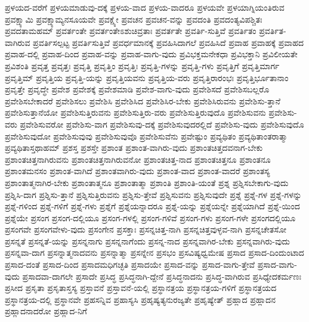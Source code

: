{ಪ್ರಳಯದ-ವರೆಗೆ
ಪ್ರಳಯಮಾಡುವು-ದಕ್ಕೆ
ಪ್ರಳಯ-ವಾದ
ಪ್ರಳಯ-ವಾದರೂ
ಪ್ರಳಯವೇ
ಪ್ರಳಯಾಗ್ನಿಯಂತಿರುವ
ಪ್ರವಕ್ಷ್ಯಾಮಿ
ಪ್ರವಕ್ಷ್ಯಾಮ್ಯನಸೂಯವೇ
ಪ್ರವಕ್ಷ್ಯೇ
ಪ್ರವಚನ
ಪ್ರವಚನ-ವನ್ನು
ಪ್ರವದಂತಿ
ಪ್ರವದಂತ್ಯವಿಪಶ್ಚಿತಃ
ಪ್ರವದತಾಮಹಮ್
ಪ್ರವರ್ತಂತೇ
ಪ್ರವರ್ತಂತೇಽಶುಚಿವ್ರತಾಃ
ಪ್ರವರ್ತತೇ
ಪ್ರವರ್ತಿ-ಸುತ್ತಿವೆ
ಪ್ರವರ್ತಿತಂ
ಪ್ರವರ್ತಿತ-ವಾಗಿರುವ
ಪ್ರವರ್ತಿಸಲ್ಪಟ್ಟ
ಪ್ರವರ್ತಿಸುತ್ತಿವೆ
ಪ್ರವರ್ಧಮಾನಕ್ಕೆ
ಪ್ರವಹಿಸಿದಾಗಲೆ
ಪ್ರವಹಿಸಿದೆ
ಪ್ರವಾಹ
ಪ್ರವಾಹಕ್ಕೆ
ಪ್ರವಾಹದ
ಪ್ರವಾಹ-ದಲ್ಲಿ
ಪ್ರವಾಹ-ದಿಂದ
ಪ್ರವಾಹ-ವನ್ನು
ಪ್ರವಾಹ-ವಾಗು-ವುದು
ಪ್ರವಿಭಕ್ತಮನೇಕಧಾ
ಪ್ರವಿಭಕ್ತಾನಿ
ಪ್ರವಿಲೀಯತೇ
ಪ್ರವಿಶಂತಿ
ಪ್ರವೃತ್ತ
ಪ್ರವೃತ್ತಃ
ಪ್ರವೃತ್ತಿ
ಪ್ರವೃತ್ತಿಂ
ಪ್ರವೃತ್ತಿಃ
ಪ್ರವೃತ್ತಿ-ಗಳನ್ನು
ಪ್ರವೃತ್ತಿ-ಗಳು
ಪ್ರವೃತ್ತಿಗೆ
ಪ್ರವೃತ್ತಿಮಾರ್ಗ
ಪ್ರವೃತ್ತಿಮ್
ಪ್ರವೃತ್ತಿಯ
ಪ್ರವೃತ್ತಿ-ಯನ್ನು
ಪ್ರವೃತ್ತಿಯವನು
ಪ್ರವೃತ್ತಿಯ-ವರು
ಪ್ರವೃತ್ತಿರಾರಂಭಃ
ಪ್ರವೃತ್ತಿರ್ಭೂತಾನಾಂ
ಪ್ರವೃತ್ತೇ
ಪ್ರವೃದ್ಧೇ
ಪ್ರವೇಶ
ಪ್ರವೇಶಕ್ಕೆ
ಪ್ರವೇಶಮಾಡಿ
ಪ್ರವೇಶ-ವಾಗು-ವುದು
ಪ್ರವೇಶಿಸದೆ
ಪ್ರವೇಶಿಸಬಲ್ಲರೊ
ಪ್ರವೇಶಿಸಬೇಕಾದರೆ
ಪ್ರವೇಶಿಸಲು
ಪ್ರವೇಶಿಸಿ
ಪ್ರವೇಶಿಸಿದ
ಪ್ರವೇಶಿಸಿರ-ಬೇಕು
ಪ್ರವೇಶಿಸಿರುವನು
ಪ್ರವೇಶಿಸು-ತ್ತಾನೆ
ಪ್ರವೇಶಿಸುತ್ತಾನೆಯೋ
ಪ್ರವೇಶಿಸುತ್ತಿರುವನು
ಪ್ರವೇಶಿಸುತ್ತಿರು-ವರು
ಪ್ರವೇಶಿಸುತ್ತಿರುವುದೊ
ಪ್ರವೇಶಿಸುವನು
ಪ್ರವೇಶಿಸು-ವರು
ಪ್ರವೇಶಿಸುವರೋ
ಪ್ರವೇಶಿಸು-ವಾಗ
ಪ್ರವೇಶಿಸುವು-ದಕ್ಕೆ
ಪ್ರವೇಶಿಸುವುದರಲ್ಲಿದೆ
ಪ್ರವೇಶಿಸು-ವುದು
ಪ್ರವೇಶಿಸುವುದೊ
ಪ್ರವೇಶಿಸುವುದೋ
ಪ್ರವೇಶಿಸುವುವು
ಪ್ರವೇಶಿಸುವುವೊ
ಪ್ರವೇಶಿಸುವೆನು
ಪ್ರವೇಷ್ಟುಂ
ಪ್ರವ್ಯಥಿತಂ
ಪ್ರವ್ಯಥಿತಾಂತರಾತ್ಮಾ
ಪ್ರವ್ಯಥಿತಾಸ್ತಥಾಹಮ್
ಪ್ರಶಸ್ತ
ಪ್ರಶಸ್ತೇ
ಪ್ರಶಾಂತ
ಪ್ರಶಾಂತ-ವಾಗಿರು-ವುದು
ಪ್ರಶಾಂತಚಿತ್ತದವನಾಗ-ಬೇಕು
ಪ್ರಶಾಂತಚಿತ್ತನಾಗಿರುವನು
ಪ್ರಶಾಂತಚಿತ್ತನಾಗಿರುವನೋ
ಪ್ರಶಾಂತಚಿತ್ತ-ನಾದ
ಪ್ರಶಾಂತಚಿತ್ತನೂ
ಪ್ರಶಾಂತನೂ
ಪ್ರಶಾಂತಮನಸಂ
ಪ್ರಶಾಂತ-ವಾಗಿದೆ
ಪ್ರಶಾಂತವಾಗಿರು-ವುದು
ಪ್ರಶಾಂತ-ವಾದ
ಪ್ರಶಾಂತ-ವಾದರೆ
ಪ್ರಶಾಂತಸ್ಯ
ಪ್ರಶಾಂತಾತ್ಮನಾಗಿರ-ಬೇಕು
ಪ್ರಶಾಂತಾತ್ಮನೂ
ಪ್ರಶಾಂತಾತ್ಮಾ
ಪ್ರಶಾಂತಿ
ಪ್ರಶಾಂತಿ-ಯಂತೆ
ಪ್ರಶ್ನ
ಪ್ರಶ್ನಿಸಬೇಕಾಗು-ವುದು
ಪ್ರಶ್ನಿಸಿ-ದಾಗ
ಪ್ರಶ್ನಿಸು-ತ್ತಾನೆ
ಪ್ರಶ್ನಿಸುತ್ತಿರುವನು
ಪ್ರಶ್ನಿಸು-ತ್ತೇವೆ
ಪ್ರಶ್ನಿಸುವನು
ಪ್ರಶ್ನಿಸುವುದೇ
ಪ್ರಶ್ನೆ
ಪ್ರಶ್ನೆ-ಗಳ
ಪ್ರಶ್ನೆ-ಗಳನ್ನು
ಪ್ರಶ್ನೆ-ಗಳಿಂದ
ಪ್ರಶ್ನೆ-ಗಳಿಗೆ
ಪ್ರಶ್ನೆ-ಗಳು
ಪ್ರಶ್ನೆಗೆ
ಪ್ರಶ್ನೆಯನ್ನಾದರೂ
ಪ್ರಶ್ನೆ-ಯನ್ನು
ಪ್ರಶ್ನೆಯನ್ನೇ
ಪ್ರಶ್ನೆಯಾಗಿದೆ
ಪ್ರಶ್ನೆ-ಯಿಂದ
ಪ್ರಶ್ನೆಯೇ
ಪ್ರಸಂಗ
ಪ್ರಸಂಗ-ದಲ್ಲಿಯೂ
ಪ್ರಸಂಗ-ಗಳಲ್ಲಿ
ಪ್ರಸಂಗ-ಗಳಿವೆ
ಪ್ರಸಂಗ-ಗಳು
ಪ್ರಸಂಗ-ಗಳೇ
ಪ್ರಸಂಗದಲ್ಲಿಯೂ
ಪ್ರಸಂಗವೇ
ಪ್ರಸಂಗವೇಳು-ವುದು
ಪ್ರಸಂಗೇನ
ಪ್ರಸಕ್ತಾಃ
ಪ್ರಸನ್ನಚಿತ್ತ-ನಾಗಿ
ಪ್ರಸನ್ನಚಿತ್ತವುಳ್ಳವ-ನಾಗಿ
ಪ್ರಸನ್ನಚೇತಸೋ
ಪ್ರಸನ್ನತೆ
ಪ್ರಸನ್ನತೆ-ಯನ್ನು
ಪ್ರಸನ್ನನಾಗು
ಪ್ರಸನ್ನನಾಗೆಂದು
ಪ್ರಸನ್ನ-ನಾದ
ಪ್ರಸನ್ನವಾಗಿರ-ಬೇಕು
ಪ್ರಸನ್ನವಾಗಿರು-ವುದು
ಪ್ರಸನ್ನವಾ-ದಾಗ
ಪ್ರಸನ್ನಾತ್ಮನಾದವನು
ಪ್ರಸನ್ನಾತ್ಮಾ
ಪ್ರಸನ್ನೇನ
ಪ್ರಸಭಂ
ಪ್ರಸವಿಷ್ಯಧ್ವಮೇಷ
ಪ್ರಸಾದ
ಪ್ರಸಾದ-ದಿಂದುಂಟಾದ
ಪ್ರಸಾದ-ದಂತೆ
ಪ್ರಸಾದ-ದಿಂದ
ಪ್ರಸಾದಮಧಿಗಚ್ಛತಿ
ಪ್ರಸಾದಯೇ
ಪ್ರಸಾದ-ವನ್ನು
ಪ್ರಸಾದ-ವಾಗು-ತ್ತೇವೆ
ಪ್ರಸಾದ-ವಾಗು-ವುದು
ಪ್ರಸಾದವಾ-ದಾಗಲೇ
ಪ್ರಸಾದೇ
ಪ್ರಸಿದ್ಧ
ಪ್ರಸಿದ್ಧನಾಗಿ-ದ್ದೇನೆ
ಪ್ರಸಿದ್ಧನಾದನು
ಪ್ರಸಿದ್ಧ-ವಾಗಿರುವ
ಪ್ರಸಿಧ್ಯೇದಕರ್ಮಣಃ
ಪ್ರಸೀದ
ಪ್ರಸೃತಾ
ಪ್ರಸೃತಾಸ್ತಸ್ಯ
ಪ್ರಸ್ತಾವನೆ
ಪ್ರಸ್ತಾವನೆ-ಯಲ್ಲಿ
ಪ್ರಸ್ಥಾನತ್ರಯ
ಪ್ರಸ್ಥಾನತ್ರಯ-ಗಳಿಗೆ
ಪ್ರಸ್ಥಾನತ್ರಯದ
ಪ್ರಸ್ಥಾನತ್ರಯ-ದಲ್ಲಿ
ಪ್ರಸ್ಥಾನವೇ
ಪ್ರಹಸನ್ನಿವ
ಪ್ರಹಾಸ್ಯಸಿ
ಪ್ರಹೃಷ್ಯತ್ಯನುರಜ್ಯತೇ
ಪ್ರಹೃಷ್ಯೇತ್
ಪ್ರಹ್ಲಾದ
ಪ್ರಹ್ಲಾದನ
ಪ್ರಹ್ಲಾದನಾದರೋ
ಪ್ರಹ್ಲಾದ-ನಿಗೆ
}
